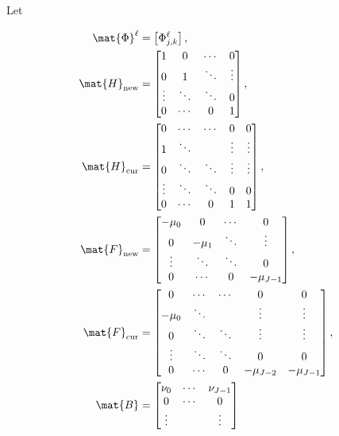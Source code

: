 \documentclass{jpmarticle}
\let\subequationsorig\subequations%
\let\endsubequationsorig\endsubequations%
\renewenvironment{subequations}{
  \subequationsorig
  \renewcommand{\theequation}{\theparentequation.\arabic{equation}}
}{
  \endsubequationsorig
}
\begin{document}
Let
\begin{subequations}
  \begin{align}
    \mat{\Phi}^{\ell}
    &= \left[\Phi_{j, k}^{\ell}\right],
    \\
    \mat{H}_{\mathrm{new}} &=
    \begin{bmatrix}
      1 & 0 & \cdots & 0
      \\
      0 & 1 & \ddots & \vdots
      \\
      \vdots & \ddots & \ddots & 0
      \\
      0 & \cdots & 0 & 1
    \end{bmatrix},
    \\
    \mat{H}_{\mathrm{cur}} &=
    \begin{bmatrix}
      0 & \cdots & \cdots & 0 & 0
      \\
      1 & \ddots & & \vdots & \vdots
      \\
      0 & \ddots & \ddots & \vdots & \vdots
      \\
      \vdots & \ddots & \ddots & 0 & 0
      \\
      0 & \cdots & 0 & 1 & 1
    \end{bmatrix},
    \\
    \mat{F}_{\mathrm{new}} &=
    \begin{bmatrix}
      - \mu_0 & 0 & \cdots & 0
      \\
      0 & - \mu_1 & \ddots & \vdots
      \\
      \vdots & \ddots & \ddots & 0
      \\
      0 & \cdots & 0 & - \mu_{J - 1}
    \end{bmatrix},
    \\
    \mat{F}_{\mathrm{cur}} &=
    \begin{bmatrix}
      0 & \cdots & \cdots & 0 & 0
      \\
      - \mu_0 & \ddots & & \vdots & \vdots
      \\
      0 & \ddots & \ddots & \vdots & \vdots
      \\
      \vdots & \ddots & \ddots & 0 & 0
      \\
      0 & \cdots & 0 & - \mu_{J - 2} & - \mu_{J - 1}
    \end{bmatrix},
    \\
    \mat{B} &=
    \begin{bmatrix}
      \nu_0 & \cdots & \nu_{J - 1} \\
      0 & \cdots & 0 \\
      \vdots & & \vdots \\

\end{bmatrix}
\end{align}
\end{subequations}
\end{document}
